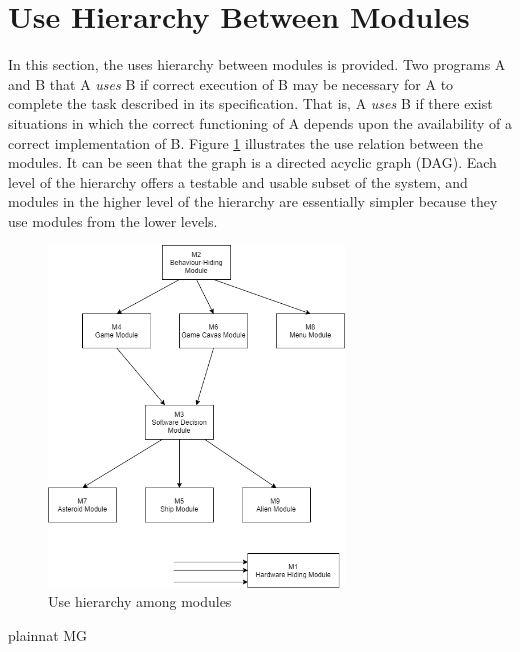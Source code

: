 \documentclass[12pt, titlepage]{article}
\begin{document}
\section{Use Hierarchy Between Modules} \label{SecUse}

In this section, the uses hierarchy between modules is
provided. Two programs A and B that A {\em uses} B if
correct execution of B may be necessary for A to complete the task described in
its specification. That is, A {\em uses} B if there exist situations in which
the correct functioning of A depends upon the availability of a correct
implementation of B.  Figure \ref{FigUH} illustrates the use relation between
the modules. It can be seen that the graph is a directed acyclic graph
(DAG). Each level of the hierarchy offers a testable and usable subset of the
system, and modules in the higher level of the hierarchy are essentially simpler
because they use modules from the lower levels.

\begin{figure}[H]
\centering
\includegraphics[width=0.7\textwidth]{modules.png}
\caption{Use hierarchy among modules}
\label{FigUH}
\end{figure}


 {plainnat}
 {MG}
\end{document}
